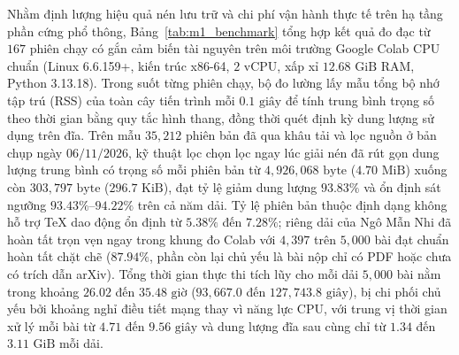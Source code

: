 Nhằm định lượng hiệu quả nén lưu trữ và chi phí vận hành thực tế trên hạ tầng phần cứng phổ thông, Bảng~\ref{tab:m1_benchmark} tổng hợp kết quả đo đạc từ $167$ phiên chạy có gắn cảm biến tài nguyên trên môi trường Google Colab CPU chuẩn (Linux 6.6.159+, kiến trúc x86-64, $2$ vCPU, xấp xỉ $12.68\text{ GiB}$ RAM, Python 3.13.18). Trong suốt từng phiên chạy, bộ đo lường lấy mẫu tổng bộ nhớ tập trú (RSS) của toàn cây tiến trình mỗi $0.1\text{ giây}$ để tính trung bình trọng số theo thời gian bằng quy tắc hình thang, đồng thời quét định kỳ dung lượng sử dụng trên đĩa. Trên mẫu $35{,}212$ phiên bản đã qua khâu tải và lọc nguồn ở bản chụp ngày $06/11/2026$, kỹ thuật lọc chọn lọc ngay lúc giải nén đã rút gọn dung lượng trung bình có trọng số mỗi phiên bản từ $4{,}926{,}068\text{ byte}$ ($4.70\text{ MiB}$) xuống còn $303{,}797\text{ byte}$ ($296.7\text{ KiB}$), đạt tỷ lệ giảm dung lượng $93.83\%$ và ổn định sát ngưỡng $93.43\%$--$94.22\%$ trên cả năm dải. Tỷ lệ phiên bản thuộc định dạng không hỗ trợ TeX dao động ổn định từ $5.38\%$ đến $7.28\%$; riêng dải của Ngô Mẫn Nhi đã hoàn tất trọn vẹn ngay trong khung đo Colab với $4{,}397$ trên $5{,}000$ bài đạt chuẩn hoàn tất chặt chẽ ($87.94\%$, phần còn lại chủ yếu là bài nộp chỉ có PDF hoặc chưa có trích dẫn arXiv). Tổng thời gian thực thi tích lũy cho mỗi dải $5{,}000$ bài nằm trong khoảng $26.02$ đến $35.48\text{ giờ}$ ($93{,}667.0$ đến $127{,}743.8\text{ giây}$), bị chi phối chủ yếu bởi khoảng nghỉ điều tiết mạng thay vì năng lực CPU, với trung vị thời gian xử lý mỗi bài từ $4.71$ đến $9.56\text{ giây}$ và dung lượng đĩa sau cùng chỉ từ $1.34$ đến $3.11\text{ GiB}$ mỗi dải.

